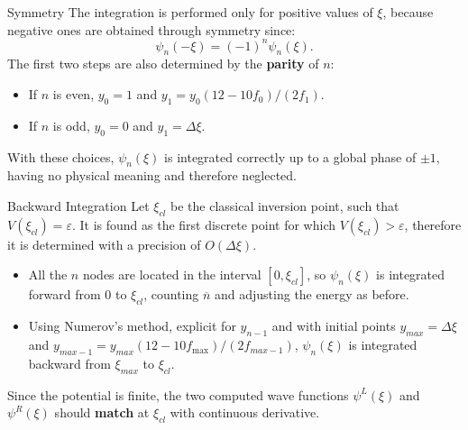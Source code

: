 \documentclass{beamer}
\begin{document}
\begin{frame}{Symmetry}
The integration is performed only for positive values of $\xi$, because negative ones are obtained through symmetry since:
\vspace{0.5em}
$$\psi_n(-\xi)=(-1)^n\psi_n(\xi).$$
\vspace{0.5em}
The first two steps are also determined by the \textbf{parity} of $n$:\\
\vspace{0.5em}
\begin{itemize}
\item If $n$ is even, $y_0=1$ and $y_1=y_0(12-10f_0)/(2f_1)$. 
\vspace{0.5em}
\item If $n$ is odd, $y_0=0$ and $y_1=\Delta \xi$.
\end{itemize}
\vspace{0.5em}
With these choices, $\psi_n(\xi)$ is integrated correctly up to a global phase of $\pm1$, having no physical meaning and therefore neglected.
\end{frame}

\begin{frame}{Backward Integration}
Let $\xi_{cl}$ be the classical inversion point, such that $V(\xi_{cl})=\varepsilon$. It is found as the first discrete point for which $V(\xi_{cl})>\varepsilon$, therefore it is determined with a precision of $O(\Delta \xi).$
\vspace{0.5em}
\begin{itemize}
\item All the $n$ nodes are located in the interval $[0,\xi_{cl}]$, so $\psi_n(\xi)$ is integrated forward from $0$ to $\xi_{cl}$, counting $\overline{n}$ and adjusting the energy as before. 
\vspace{0.5em}
\item Using Numerov's method, explicit for $y_{n-1}$ and with initial points $y_{max}=\Delta \xi$ and $y_{max-1}=y_{max}(12-10f_{\max})/(2f_{max-1})$, $\psi_n(\xi)$ is integrated backward from $\xi_{max}$ to $\xi_{cl}$.
\end{itemize}
\vspace{0.5em}
Since the potential is finite, the two computed wave functions $\psi^L(\xi)$ and $\psi^R(\xi)$ should \textbf{match} at $\xi_{cl}$ with continuous derivative.
\end{frame}
\end{document}
